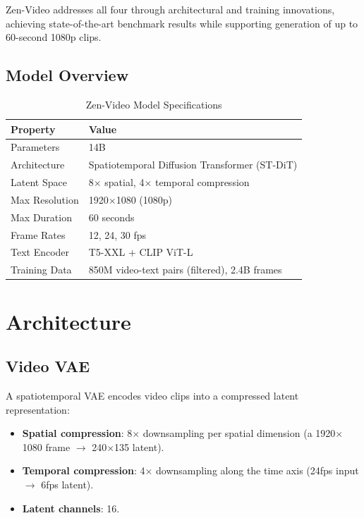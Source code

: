 \documentclass[11pt,a4paper]{article}
\begin{document}
Zen-Video addresses all four through architectural and training innovations, achieving
state-of-the-art benchmark results while supporting generation of up to 60-second 1080p clips.

\subsection{Model Overview}

\begin{table}[H]
\centering
\begin{tabular}{ll}
\toprule
\textbf{Property} & \textbf{Value} \\
\midrule
Parameters & 14B \\
Architecture & Spatiotemporal Diffusion Transformer (ST-DiT) \\
Latent Space & 8$\times$ spatial, 4$\times$ temporal compression \\
Max Resolution & 1920$\times$1080 (1080p) \\
Max Duration & 60 seconds \\
Frame Rates & 12, 24, 30 fps \\
Text Encoder & T5-XXL + CLIP ViT-L \\
Training Data & 850M video-text pairs (filtered), 2.4B frames \\
\bottomrule
\end{tabular}
\caption{Zen-Video Model Specifications}
\end{table}

\section{Architecture}

\subsection{Video VAE}

A spatiotemporal VAE encodes video clips into a compressed latent representation:
\begin{itemize}
    \item \textbf{Spatial compression}: 8$\times$ downsampling per spatial dimension
    (a 1920$\times$1080 frame $\to$ 240$\times$135 latent).
    \item \textbf{Temporal compression}: 4$\times$ downsampling along the time axis
    (24fps input $\to$ 6fps latent).
    \item \textbf{Latent channels}: 16.
\end{itemize}
\end{document}
